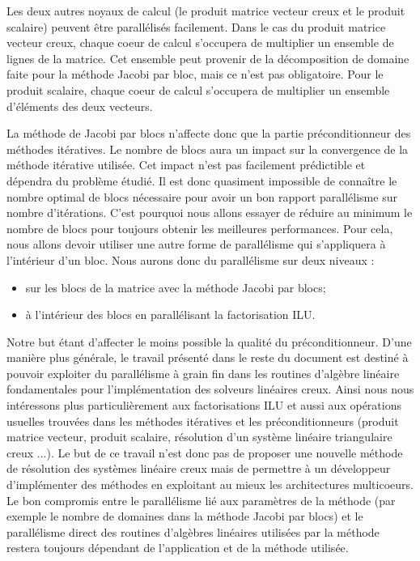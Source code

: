 Les deux autres noyaux de calcul (le produit matrice vecteur creux et le produit scalaire) peuvent être parallélisés facilement.
%
Dans le cas du produit matrice vecteur creux, chaque coeur de calcul s'occupera de multiplier un ensemble de lignes de la matrice.
%
Cet ensemble peut provenir de la décomposition de domaine faite pour la méthode Jacobi par bloc, mais ce n'est pas obligatoire.
%
Pour le produit scalaire, chaque coeur de calcul s'occupera de multiplier un ensemble d'éléments des deux vecteurs.


La méthode de Jacobi par blocs n'affecte donc que la partie préconditionneur des méthodes itératives.
%
Le nombre de blocs aura un impact sur la convergence de la méthode itérative utilisée.
%
Cet impact n'est pas facilement prédictible et dépendra du problème étudié.
%
Il est donc quasiment impossible de connaître le nombre optimal de blocs nécessaire pour avoir un bon rapport parallélisme sur nombre d'itérations.
%
C'est pourquoi nous allons essayer de réduire au minimum le nombre de blocs pour toujours obtenir les meilleures performances.
%
Pour cela, nous allons devoir utiliser une autre forme de parallélisme qui s'appliquera à l'intérieur d'un bloc.
%
Nous aurons donc du parallélisme sur deux niveaux :
\begin{itemize}
  \item sur les blocs de la matrice avec la méthode Jacobi par blocs;
  \item à l'intérieur des blocs en parallélisant la factorisation ILU.
\end{itemize}
%
Notre but étant d'affecter le moins possible la qualité du préconditionneur.
%
D'une manière plus générale, le travail présenté dans le reste du document est destiné à pouvoir exploiter du parallélisme à grain fin dans les routines d'algèbre linéaire fondamentales pour l'implémentation des solveurs linéaires creux.
%
Ainsi nous nous intéressons plus particulièrement aux factorisations ILU et aussi aux opérations usuelles trouvées dans les méthodes itératives et les préconditionneurs (produit matrice vecteur, produit scalaire, résolution d'un système linéaire triangulaire creux ...).
%
Le but de ce travail n'est donc pas de proposer une nouvelle méthode de résolution des systèmes linéaire creux mais de permettre à un développeur d'implémenter des méthodes en exploitant au mieux les architectures multicoeurs.
%
Le bon compromis entre le parallélisme lié aux paramètres de la méthode (par exemple le nombre de domaines dans la méthode Jacobi par blocs) et le parallélisme direct des routines d'algèbres linéaires utilisées par la méthode restera toujours dépendant de l'application et de la méthode utilisée.
